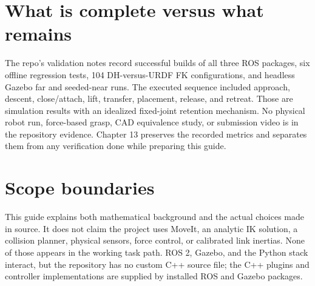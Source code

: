 \section{What is complete versus what remains}
The repo's validation notes record successful builds of all three ROS packages,
six offline regression tests, 104 DH-versus-URDF FK configurations, and
headless Gazebo far and seeded-near runs. The executed sequence included
approach, descent, close/attach, lift, transfer, placement, release, and
retreat. Those are simulation results with an idealized fixed-joint retention
mechanism. No physical robot run, force-based grasp, CAD equivalence study, or
submission video is in the repository evidence. Chapter 13 preserves the
recorded metrics and separates them from any verification done while preparing
this guide.

\section{Scope boundaries}
This guide explains both mathematical background and the actual choices made
in source. It does not claim the project uses MoveIt, an analytic IK solution,
a collision planner, physical sensors, force control, or calibrated link
inertias. None of those appears in the working task path. ROS 2, Gazebo, and
the Python stack interact, but the repository has no custom C++ source file;
the C++ plugins and controller implementations are supplied by installed ROS
and Gazebo packages.
